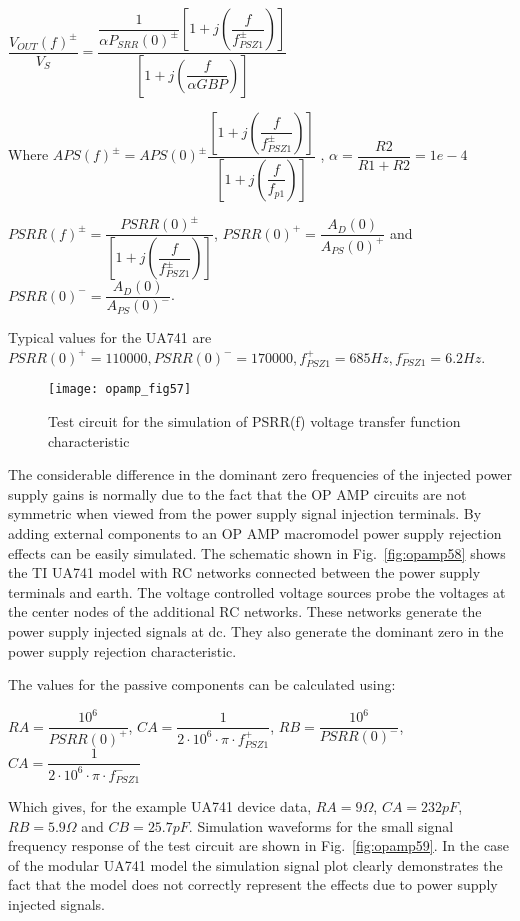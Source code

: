 \bigskip 

$\dfrac{V_{OUT}(f)^{\pm}}{V_{S}}=\dfrac{\dfrac{1}{\alpha P_{SRR}(0)^{\pm}} \left[ 1+j\left( \dfrac{f}{f_{PSZ1}^{\pm}}  \right) \right] }                  {\left[ 1+j\left( \dfrac{f}{\alpha GBP} \right) \right] }$

\bigskip 

Where  $APS(f)^{\pm}=APS(0)^{\pm} \dfrac{\left[ 1+j\left( \dfrac{f}{f_{PSZ1}^{\pm}}\right) \right] }{\left[ 1+j\left( \dfrac{f}{f_{p1}}\right) \right] } $ ,  $\alpha=\dfrac{R2}{R1+R2} = 1e-4$


$PSRR(f)^{\pm} = \dfrac{PSRR(0)^{\pm}}   {\left[ 1+j\left( \dfrac{f}{f_{PSZ1}^{\pm}} \right) \right]}$, $PSRR(0)^{+}=\dfrac{A_{D}(0)}{A_{PS}(0)^{+}}$ and $PSRR(0)^{-}=\dfrac{A_{D}(0)}{A_{PS}(0)^{-}}$.

Typical values for the UA741 are $PSRR(0)^{+}=110000, PSRR(0)^{-}=170000,    f_{PSZ1}^{+}=685Hz, f_{PSZ1}^{-}=6.2Hz$.
\begin{figure} 
  \centering 
  \texttt{[image: opamp\_fig57]}
  \caption{Test circuit for the simulation of PSRR(f) voltage transfer function characteristic}  
  \label{fig:opamp57}
\end{figure}
The considerable difference in the dominant zero frequencies of the  injected power supply gains is normally due to the fact that the OP AMP circuits are not symmetric when viewed from the power supply signal injection terminals. 
By adding external components to an OP AMP macromodel power supply rejection effects can be easily simulated.  The schematic shown in Fig.~\ref{fig:opamp58} shows the TI UA741 model with RC networks connected between the power supply terminals and earth.  The voltage controlled voltage sources probe the voltages at the center nodes of the additional RC networks.  These networks generate the power supply injected signals at dc. They also generate the dominant zero in the power supply rejection characteristic.  
\begin{flushleft}
The values for the passive components can be calculated using:                                                                               \end{flushleft}
$RA=\dfrac{10^{6}}{PSRR(0)^{+}}$, $CA=\dfrac{1}{2 \cdot 10^{6} \cdot \pi \cdot f_{PSZ1}^{+}}$, $RB=\dfrac{10^{6}}{PSRR(0)^{-}}$, $CA=\dfrac{1}{2 \cdot 10^{6} \cdot \pi \cdot f_{PSZ1}^{-}}$

\bigskip
Which gives, for the example UA741 device data, $RA=9\Omega$, $CA=232pF$, $RB=5.9\Omega$ and $CB=25.7pF$.
Simulation waveforms for the small signal frequency response of the test circuit are shown in Fig.~\ref{fig:opamp59}.  In the case of the modular UA741 model the simulation signal plot clearly demonstrates the fact that the model does not correctly represent the effects due to power supply injected signals. 

